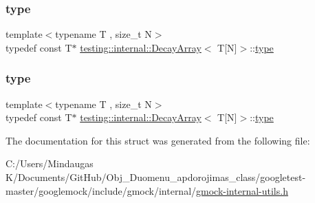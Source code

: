 \mbox{\label{structtesting_1_1internal_1_1_decay_array_3_01_t[_n]_4_afc22a88da484b94639501c07fb90bfd3}} 
\subsubsection{\texorpdfstring{type}{type}\hspace{0.1cm}{\footnotesize\ttfamily [2/3]}}
{\footnotesize\ttfamily template$<$typename T , size\+\_\+t N$>$ \\
typedef const T$\ast$ \mbox{\hyperlink{structtesting_1_1internal_1_1_decay_array}{testing\+::internal\+::\+Decay\+Array}}$<$ T\mbox{[}N\mbox{]}$>$\+::\mbox{\hyperlink{structtesting_1_1internal_1_1_decay_array_3_01_t[_n]_4_afc22a88da484b94639501c07fb90bfd3}{type}}}

\mbox{\label{structtesting_1_1internal_1_1_decay_array_3_01_t[_n]_4_afc22a88da484b94639501c07fb90bfd3}} 
\subsubsection{\texorpdfstring{type}{type}\hspace{0.1cm}{\footnotesize\ttfamily [3/3]}}
{\footnotesize\ttfamily template$<$typename T , size\+\_\+t N$>$ \\
typedef const T$\ast$ \mbox{\hyperlink{structtesting_1_1internal_1_1_decay_array}{testing\+::internal\+::\+Decay\+Array}}$<$ T\mbox{[}N\mbox{]}$>$\+::\mbox{\hyperlink{structtesting_1_1internal_1_1_decay_array_3_01_t[_n]_4_afc22a88da484b94639501c07fb90bfd3}{type}}}



The documentation for this struct was generated from the following file\+:\begin{DoxyCompactItemize}
\item 
C\+:/\+Users/\+Mindaugas K/\+Documents/\+Git\+Hub/\+Obj\+\_\+\+Duomenu\+\_\+apdorojimas\+\_\+class/googletest-\/master/googlemock/include/gmock/internal/\mbox{\hyperlink{googletest-master_2googlemock_2include_2gmock_2internal_2gmock-internal-utils_8h}{gmock-\/internal-\/utils.\+h}}\end{DoxyCompactItemize}
